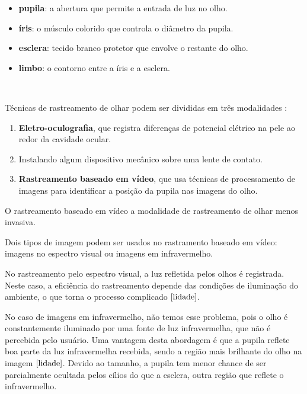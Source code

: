 \begin{itemize}
\item \textbf{pupila}: a abertura que permite a entrada de luz no olho.
\item \textbf{íris}: o músculo colorido que controla o diâmetro da pupila.
\item \textbf{esclera}: tecido branco protetor que envolve o restante do olho.
\item \textbf{limbo}: o contorno entre a íris e a esclera.
\end{itemize}


~ %

Técnicas de rastreamento de olhar podem ser divididas em três modalidades \cite{valenti2009webcam}:

\begin{enumerate}
\item {\bf Eletro-oculografia}, que registra diferenças de potencial elétrico na pele ao redor da cavidade ocular.
\item Instalando algum dispositivo mecânico sobre uma lente de contato.
\item  {\bf Rastreamento baseado em vídeo}, que usa técnicas de processamento de imagens para identificar a posição da pupila nas imagens do olho.
\end{enumerate}

O rastreamento baseado em vídeo a modalidade de rastreamento de olhar menos invasiva.

Dois tipos de imagem podem ser usados no rastramento baseado em vídeo: imagens no espectro visual ou imagens em infravermelho.

No rastreamento pelo espectro visual, a luz refletida pelos olhos é registrada. Neste caso, a eficiência do rastreamento depende das condições de iluminação do ambiente, o que torna o processo complicado $\cite{lidade}$.

No caso de imagens em infravermelho, não temos esse problema, pois o olho é constantemente iluminado por uma fonte de luz infravermelha, que não é percebida pelo usuário. Uma vantagem desta abordagem é que a pupila reflete boa parte da luz infravermelha recebida, sendo a região mais brilhante do olho na imagem $\cite{lidade}$. Devido ao tamanho, a pupila tem menor chance de ser parcialmente ocultada pelos  cílios do que a esclera, outra região que reflete o infravermelho. %

